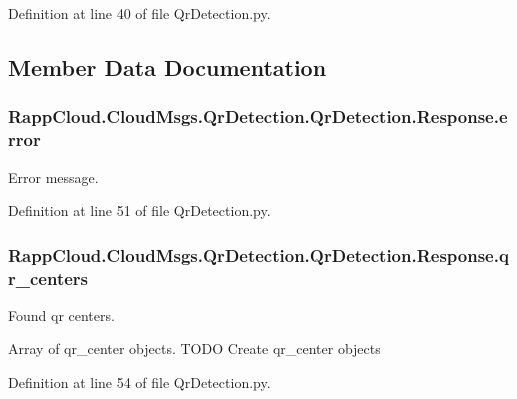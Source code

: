Definition at line 40 of file Qr\-Detection.\-py.



\subsection{Member Data Documentation}
\hypertarget{classRappCloud_1_1CloudMsgs_1_1QrDetection_1_1QrDetection_1_1Response_add345b2531caa7c32c21c7dd75d66546}{
\subsubsection[{error}]{\setlength{\rightskip}{0pt plus 5cm}Rapp\-Cloud.\-Cloud\-Msgs.\-Qr\-Detection.\-Qr\-Detection.\-Response.\-error}}\label{classRappCloud_1_1CloudMsgs_1_1QrDetection_1_1QrDetection_1_1Response_add345b2531caa7c32c21c7dd75d66546}


Error message. 



Definition at line 51 of file Qr\-Detection.\-py.

\hypertarget{classRappCloud_1_1CloudMsgs_1_1QrDetection_1_1QrDetection_1_1Response_aaf7ee44d0b6dae2f5d69b841dfb20008}{
\subsubsection[{qr\-\_\-centers}]{\setlength{\rightskip}{0pt plus 5cm}Rapp\-Cloud.\-Cloud\-Msgs.\-Qr\-Detection.\-Qr\-Detection.\-Response.\-qr\-\_\-centers}}\label{classRappCloud_1_1CloudMsgs_1_1QrDetection_1_1QrDetection_1_1Response_aaf7ee44d0b6dae2f5d69b841dfb20008}


Found qr centers. 

Array of qr\-\_\-center objects. T\-O\-D\-O Create qr\-\_\-center objects 

Definition at line 54 of file Qr\-Detection.\-py.

